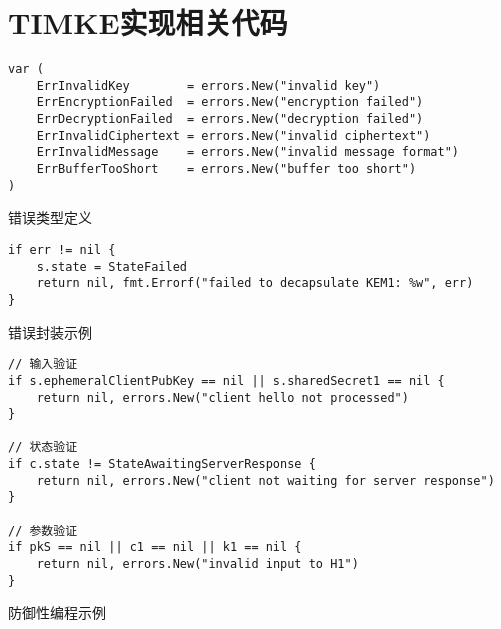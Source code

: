 \section{TIMKE实现相关代码}


\begin{listing}[ht]
\begin{verbatim}
var (
    ErrInvalidKey        = errors.New("invalid key")
    ErrEncryptionFailed  = errors.New("encryption failed")
    ErrDecryptionFailed  = errors.New("decryption failed")
    ErrInvalidCiphertext = errors.New("invalid ciphertext")
    ErrInvalidMessage    = errors.New("invalid message format")
    ErrBufferTooShort    = errors.New("buffer too short")
)
\end{verbatim}
\caption{错误类型定义}
\label{code:error-types}
\end{listing}

\begin{listing}[ht]
\begin{verbatim}
if err != nil {
    s.state = StateFailed
    return nil, fmt.Errorf("failed to decapsulate KEM1: %w", err)
}
\end{verbatim}
\caption{错误封装示例}
\label{code:error-wrapping}
\end{listing}

\begin{listing}[ht]
\begin{verbatim}
// 输入验证
if s.ephemeralClientPubKey == nil || s.sharedSecret1 == nil {
    return nil, errors.New("client hello not processed")
}

// 状态验证
if c.state != StateAwaitingServerResponse {
    return nil, errors.New("client not waiting for server response")
}

// 参数验证
if pkS == nil || c1 == nil || k1 == nil {
    return nil, errors.New("invalid input to H1")
}
\end{verbatim}
\caption{防御性编程示例}
\label{code:defensive-programming}
\end{listing}

